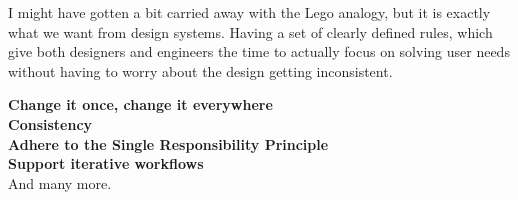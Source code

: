 I might have gotten a bit carried away with the Lego analogy, but it is exactly what we want from
design systems. Having a set of clearly defined rules, which give both designers and engineers the
time to actually focus on solving user needs without having to worry about the design getting
inconsistent. 


\textbf{Change it once, change it everywhere}\\

\textbf{Consistency}\\

\textbf{Adhere to the Single Responsibility Principle}\\

\textbf{Support iterative workflows}\\

And many more.
